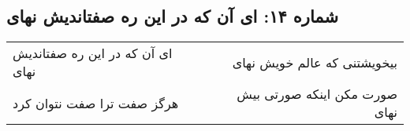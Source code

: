 \begin{center}
\section*{شماره ۱۴: ای آن که در این ره صفتاندیش نهای}
\label{sec:014}
\begin{longtable}{l p{0.5cm} r}
ای آن که در این ره صفتاندیش نهای
&&
بیخویشتنی که عالم خویش نهای
\\
هرگز صفت ترا صفت نتوان کرد
&&
صورت مکن اینکه صورتی بیش نهای
\\
\end{longtable}
\end{center}
